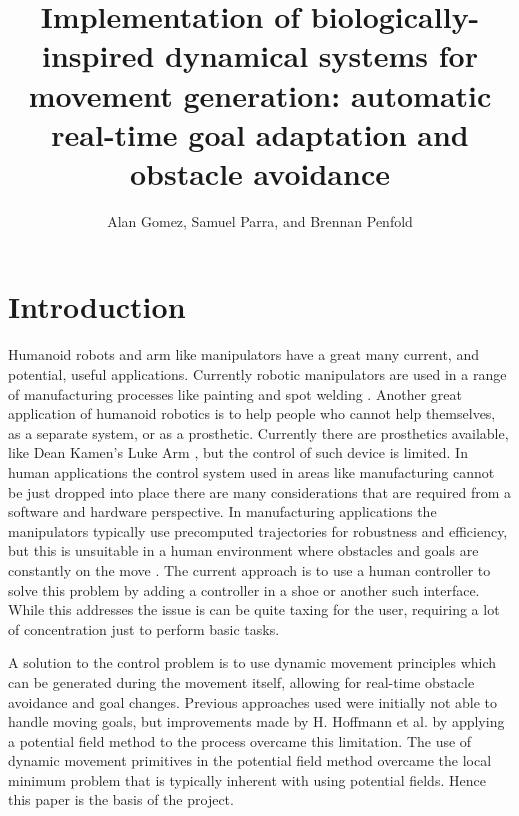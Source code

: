 \documentclass[a4paper, 10pt, conference]{ieeeconf}      %
\title{\LARGE \bf Implementation of biologically-inspired dynamical systems for movement generation: automatic real-time goal adaptation and obstacle avoidance}
\author{Alan Gomez, Samuel Parra, and Brennan Penfold}
\begin{document}
\maketitle
\thispagestyle{empty}
\pagestyle{empty}


\begin{abstract}


\end{abstract}


\section{Introduction} %

Humanoid robots and arm like manipulators have a great many current, and potential, useful applications. Currently robotic manipulators are used in a range of manufacturing processes like painting and spot welding \cite{Fadalil}. Another great application of humanoid robotics is to help people who cannot help themselves, as a separate system, or as a prosthetic. Currently there are prosthetics available, like Dean Kamen's Luke Arm \cite{Adee}, but the control of such device is limited. In human applications the control system used in areas like manufacturing cannot be just dropped into place there are many considerations that are required from a software and hardware perspective. In manufacturing applications the manipulators typically use precomputed trajectories for robustness and efficiency, but this is unsuitable in a human environment where obstacles and goals are constantly on the move \cite{Hoffmann}. The current approach is to use a human controller to solve this problem by adding a controller in a shoe \cite{Adee} or another such interface. While this addresses the issue is can be quite taxing for the user, requiring a lot of concentration just to perform basic tasks.

A solution to the control problem is to use dynamic movement principles which can be generated during the movement itself, allowing for real-time obstacle avoidance and goal changes. Previous approaches \cite{Janabi-Sharif} used were initially not able to handle moving goals, but improvements made by H. Hoffmann et al. \cite{Hoffmann} by applying a potential field method to the process overcame this limitation. The use of dynamic movement primitives in the potential field method overcame the local minimum problem that is typically inherent with using potential fields. Hence this paper is the basis of the project.
\end{document}
